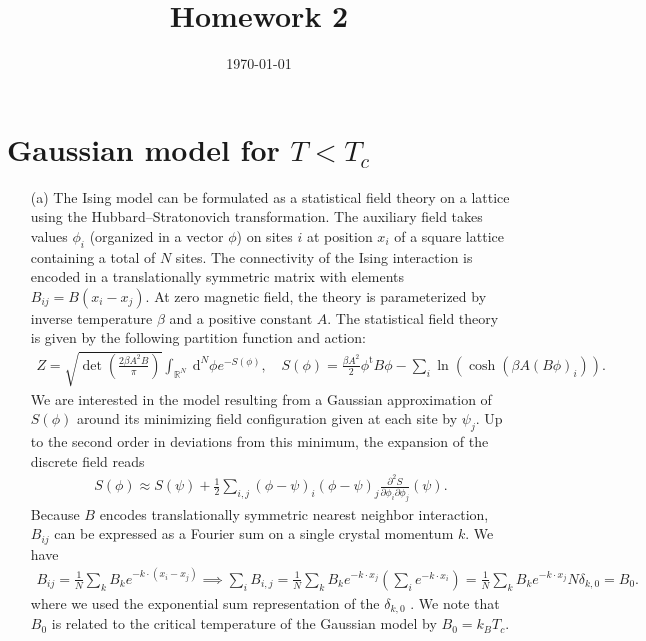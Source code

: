 \documentclass[10pt, a4paper]{article}
\title{Homework 2} %
\author{\PA} %
\date{\today} %
\begin{document}
\maketitlepage

\maketableofcontents


\footnotesize{
\section{Gaussian model for $T<T_c$}
\begin{enumerate}
  \item[(a)] The Ising model can be formulated as a statistical field theory on a lattice using the Hubbard–Stratonovich transformation. The auxiliary field takes values $\phi_i$ (organized in a vector $\phi$) on sites $i$ at position $x_i$ of a square lattice containing a total of $N$ sites. The connectivity of the Ising interaction is encoded in a translationally symmetric matrix with elements $B_{ij} = B(x_i - x_j)$. At zero magnetic field, the theory is parameterized by inverse temperature $\beta$ and a positive constant $A$. The statistical field theory is given by the following partition function and action:
  \begin{align*}
    Z=\sqrt{\operatorname{det}\left(\frac{2 \beta A^2 B}{\pi}\right)} \int_{\mathbb{R}^N} \mathrm{~d}^N \phi e^{-S(\phi)}, \quad S(\phi)=\frac{\beta A^2}{2} \phi^{\mathrm{t}} B \phi-\sum_i \ln \left(\cosh \left(\beta A(B \phi)_i\right)\right).
  \end{align*}
  We are interested in the model resulting from a Gaussian approximation of $S(\phi)$ around its minimizing field configuration given at each site by $\psi_j$. Up to the second order in deviations from this minimum, the expansion of the discrete field reads
  \begin{align*}
    S(\phi) \approx S(\psi)+\frac{1}{2} \sum_{i, j}(\phi-\psi)_i(\phi-\psi)_j \frac{\partial^2 S}{\partial \phi_i \partial \phi_j}(\psi). 
  \end{align*}
  Because $B$ encodes translationally symmetric nearest neighbor interaction, $B_{ij}$ can be expressed \cite{CitekeyBook} as a Fourier sum on a single crystal momentum $k$. We have 
  \begin{align*}
    B_{ij} = \frac{1}{N}\sum_{k} B_k e^{-k \cdot (x_i - x_j)}  \implies \sum_{i} B_{i, j} = \frac{1}{N}\sum_{k} B_k e^{-k \cdot x_j} \left(\sum_i e^{-k \cdot x_i}\right) = \frac{1}{N}\sum_{k} B_k e^{-k \cdot x_j} N\delta_{k, 0} = B_0.
  \end{align*}
  where we used the exponential sum representation of the $\delta_{k, 0}$ \cite{CitekeyBook}. We note that $B_0$ is related to the critical temperature of the Gaussian model by $B_0 = k_B T_c$. 


\end{enumerate}}
\end{document}
